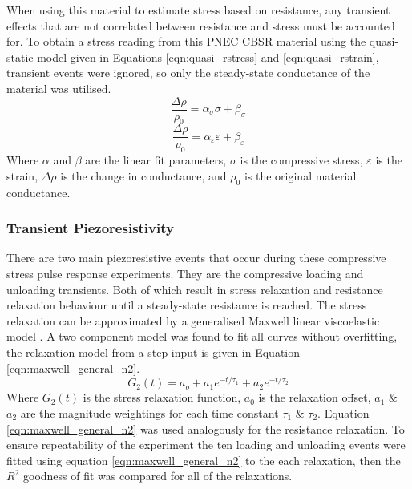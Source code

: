 When using this material to estimate stress based on resistance, any transient effects that are not correlated between resistance and stress must be accounted for. To obtain a stress reading from this PNEC CBSR material using the quasi-static model given in Equations \ref{eqn:quasi_rstress} and \ref{eqn:quasi_rstrain}, transient events were ignored, so only the steady-state conductance of the material was utilised. 
\begin{equation}
    \frac{\Delta \rho}{\rho_0} = \alpha_\sigma \sigma + \beta_\sigma
    \label{eqn:quasi_rstress}
\end{equation}
\begin{equation}
    \frac{\Delta \rho}{\rho_0} = \alpha_\varepsilon \varepsilon + \beta_\varepsilon
    \label{eqn:quasi_rstrain}
\end{equation}
Where $\alpha$ and $\beta$ are the linear fit parameters, $\sigma$ is the compressive stress, $\varepsilon$ is the strain, $\Delta \rho$ is the change in conductance, and $\rho_0$ is the original material conductance.

\subsubsection{Transient Piezoresistivity}\label{sec:Transient Piezoresistivity}
There are two main piezoresistive events that occur during these compressive stress pulse response experiments. They are the compressive loading and unloading transients. Both of which result in stress relaxation and resistance relaxation behaviour until a steady-state resistance is reached. The stress relaxation can be approximated by a generalised Maxwell linear viscoelastic model \citep{Ju2022}. A two component model was found to fit all curves without overfitting, the relaxation model from a step input is given in Equation \ref{eqn:maxwell_general_n2}.
\begin{equation}
    G_2(t) = a_o + a_1 e^{-t/\tau_1} + a_2 e^{-t/\tau_2}
    \label{eqn:maxwell_general_n2}
\end{equation}
Where $G_2(t)$ is the stress relaxation function, $a_0$ is the relaxation offset, $a_1$ \& $a_2$ are the magnitude weightings for each time constant $\tau_1$ \& $\tau_2$. Equation \ref{eqn:maxwell_general_n2} was used analogously for the resistance relaxation. %
To ensure repeatability of the experiment the ten loading and unloading events were fitted using equation \ref{eqn:maxwell_general_n2} to the each relaxation, then the $R^2$ goodness of fit was compared for all of the relaxations.

